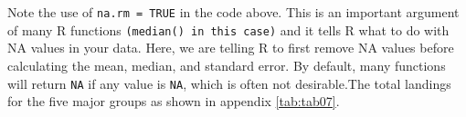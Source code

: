 \documentclass[
  12pt,
  a4paper,
  oneside]{book}
\newenvironment{Shaded}{\begin{snugshade}}{\end{snugshade}}
\newcommand{\DataTypeTok}[1]{\textcolor[rgb]{0.13,0.29,0.53}{#1}}
\newcommand{\KeywordTok}[1]{\textcolor[rgb]{0.13,0.29,0.53}{\textbf{#1}}}
\newcommand{\NormalTok}[1]{#1}
\newcommand{\OperatorTok}[1]{\textcolor[rgb]{0.81,0.36,0.00}{\textbf{#1}}}
\newcommand{\OtherTok}[1]{\textcolor[rgb]{0.56,0.35,0.01}{#1}}
\newcommand{\StringTok}[1]{\textcolor[rgb]{0.31,0.60,0.02}{#1}}
\begin{document}
\begin{Shaded}
\end{Shaded}

Note the use of \texttt{na.rm\ =\ TRUE} in the code above. This is an important argument of many R functions \texttt{(median()\ in\ this\ case)} and it tells R what to do with NA values in your data. Here, we are telling R to first remove NA values before calculating the mean, median, and standard error. By default, many functions will return \texttt{NA} if any value is \texttt{NA}, which is often not desirable.The total landings for the five major groups as shown in appendix \ref{tab:tab07}.
\end{document}
